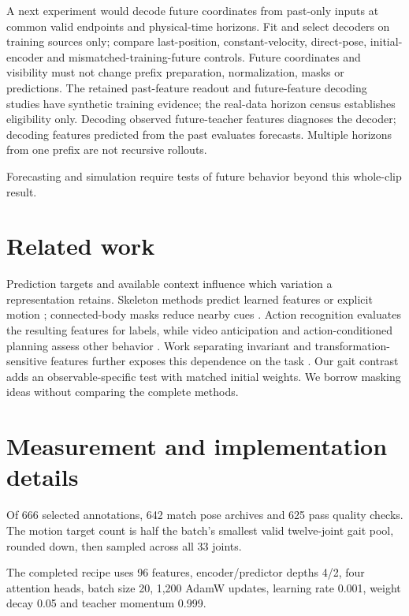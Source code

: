 \documentclass{article}
\begin{document}
A next experiment would decode future coordinates from past-only inputs
at common valid endpoints and physical-time horizons. Fit and select
decoders on training sources only; compare last-position,
constant-velocity, direct-pose, initial-encoder and
mismatched-training-future controls. Future coordinates and visibility
must not change prefix preparation, normalization, masks or predictions.
The retained past-feature readout and future-feature decoding studies
have synthetic training evidence; the real-data horizon census
establishes eligibility only. Decoding observed future-teacher features
diagnoses the decoder; decoding features predicted from the past
evaluates forecasts. Multiple horizons from one prefix are not recursive
rollouts.

Forecasting and simulation require tests of future behavior beyond this
whole-clip result.

\section{Related work}\label{related-work}

Prediction targets and available context influence which variation a
representation retains. Skeleton methods predict learned features
\citep{sjepa} or explicit motion \citep{mamp}; connected-body masks
reduce nearby cues \citep{slim}. Action recognition evaluates the
resulting features for labels, while video anticipation and
action-conditioned planning assess other behavior \citep{vjepa2}. Work
separating invariant and transformation-sensitive features further
exposes this dependence on the task \citep{seqjepa}. Our gait contrast
adds an observable-specific test with matched initial weights. We borrow
masking ideas without comparing the complete methods.

\clearpage


\clearpage
\appendix
\section{Measurement and implementation
details}\label{measurement-and-implementation-details}

Of 666 selected annotations, 642 match pose archives and 625 pass
quality checks. The motion target count is half the batch's smallest
valid twelve-joint gait pool, rounded down, then sampled across all 33
joints.

The completed recipe uses 96 features, encoder/predictor depths 4/2,
four attention heads, batch size 20, 1,200 AdamW updates, learning rate
0.001, weight decay 0.05 and teacher momentum 0.999.
\end{document}
